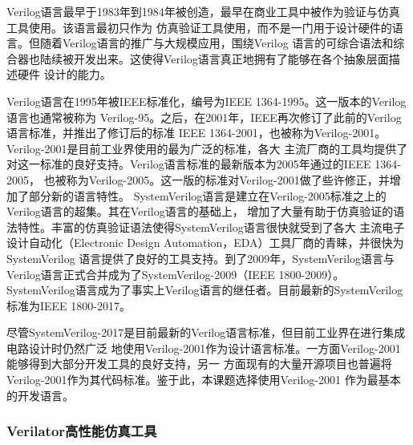 Verilog语言最早于1983年到1984年被创造，最早在商业工具中被作为验证与仿真工具使用。该语言最初只作为
仿真验证工具使用，而不是一门用于设计硬件的语言。但随着Verilog语言的推广与大规模应用，围绕Verilog
语言的可综合语法和综合器也陆续被开发出来。这使得Verilog语言真正地拥有了能够在各个抽象层面描述硬件
设计的能力。

Verilog语言在1995年被IEEE标准化，编号为IEEE 1364-1995。这一版本的Verilog语言也通常被称为
Verilog-95。之后，在2001年，IEEE再次修订了此前的Verilog语言标准，并推出了修订后的标准
IEEE 1364-2001，也被称为Verilog-2001。Verilog-2001是目前工业界使用的最为广泛的标准，各大
主流厂商的工具均提供了对这一标准的良好支持。Verilog语言标准的最新版本为2005年通过的IEEE 1364-2005，
也被称为Verilog-2005。这一版的标准对Verilog-2001做了些许修正，并增加了部分新的语言特性。
SystemVerilog语言是建立在Verilog-2005标准之上的Verilog语言的超集。其在Verilog语言的基础上，
增加了大量有助于仿真验证的语法特性。丰富的仿真验证语法使得SystemVerilog语言很快就受到了各大
主流电子设计自动化（Electronic Design Automation，EDA）工具厂商的青睐，并很快为SystemVerilog
语言提供了良好的工具支持。到了2009年，SystemVerilog语言与Verilog语言正式合并成为了SystemVerilog-2009（IEEE 1800-2009）。
SystemVerilog语言成为了事实上Verilog语言的继任者。目前最新的SystemVerilog标准为IEEE 1800-2017。

尽管SystemVerilog-2017是目前最新的Verilog语言标准，但目前工业界在进行集成电路设计时仍然广泛
地使用Verilog-2001作为设计语言标准。一方面Verilog-2001能够得到大部分开发工具的良好支持，另一
方面现有的大量开源项目也普遍将Verilog-2001作为其代码标准。鉴于此，本课题选择使用Verilog-2001
作为最基本的开发语言。

\subsubsection{Verilator高性能仿真工具}



